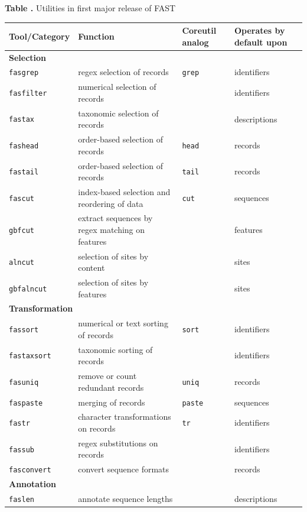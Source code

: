 \documentclass{frontiersSCNS} %
\begin{document}
\begin{table}[!t]
\textbf{\label{tab:01} Table .}{
  Utilities in first major release of FAST}

\processtable{ }
{\begin{tabular}{llll}\toprule
    Tool/Category  & Function  & Coreutil analog & Operates by default
    upon \\
 \hline
  \multicolumn{4}{l}{{\bf Selection}} \\
  \hline
    {\tt fasgrep} & regex selection of records & {\tt grep} & identifiers\\
    {\tt fasfilter} & numerical selection of records &  & identifiers \\
    {\tt fastax} & taxonomic selection of records &  & descriptions \\
    {\tt fashead} & order-based selection of records & {\tt head} & records \\
    {\tt fastail} & order-based selection of records &  {\tt tail}  & records \\
    {\tt fascut} & index-based selection and reordering of data  &    {\tt cut}  & sequences \\
    {\tt gbfcut} & extract sequences by regex matching on features  & & features\\
    {\tt alncut} & selection of sites by content &  & sites \\
    {\tt gbfalncut} & selection of sites by features &  & sites \\
 \hline
  \multicolumn{4}{l}{{\bf Transformation}} \\
  \hline    
   {\tt fassort} & numerical or text sorting of records  & {\tt sort} & identifiers\\
    {\tt fastaxsort} & taxonomic sorting of records &  & identifiers
    \\
    {\tt fasuniq} & remove or count redundant records & {\tt uniq} & records \\
    {\tt faspaste} & merging of records &  {\tt paste} & sequences \\
    {\tt fastr} & character transformations on records & {\tt tr} & identifiers\\
    {\tt fassub} & regex substitutions on records &  & identifiers \\
    {\tt fasconvert} & convert sequence formats &  &  records \\
\hline
  \multicolumn{4}{l}{{\bf Annotation}} \\
  \hline    
    {\tt faslen} & annotate sequence lengths &  & descriptions \\

\end{tabular}}
\end{table}
\end{document}

